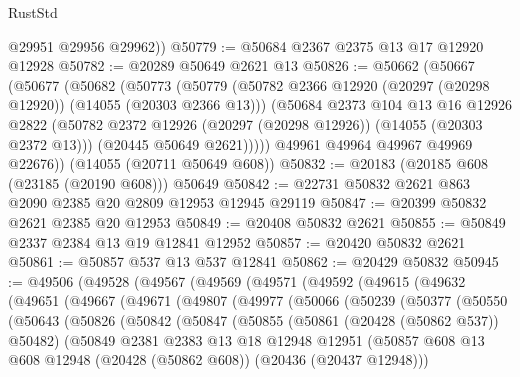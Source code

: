 \begin{lexlean}{RustStd}
\begin{coremodule}
        @29951
        @29956
        @29962))
@50779 := @50684 @2367 @2375 @13 @17 @12920 @12928
@50782 := @20289 @50649 @2621 @13
@50826 := @50662
    (@50667
      (@50677
        (@50682
          (@50773
            (@50779
              (@50782 @2366 @12920 (@20297 (@20298 @12920)) (@14055 (@20303 @2366 @13)))
              (@50684
                @2373
                @104
                @13
                @16
                @12926
                @2822
                (@50782 @2372 @12926 (@20297 (@20298 @12926)) (@14055 (@20303 @2372 @13)))
                (@20445 @50649 @2621)))))
        @49961
        @49964
        @49967
        @49969
        @22676))
    (@14055 (@20711 @50649 @608))
@50832 := @20183 (@20185 @608 (@23185 (@20190 @608))) @50649
@50842 := @22731 @50832 @2621 @863 @2090 @2385 @20 @2809 @12953 @12945 @29119
@50847 := @20399 @50832 @2621 @2385 @20 @12953
@50849 := @20408 @50832 @2621
@50855 := @50849 @2337 @2384 @13 @19 @12841 @12952
@50857 := @20420 @50832 @2621
@50861 := @50857 @537 @13 @537 @12841
@50862 := @20429 @50832
@50945 := @49506
    (@49528
      (@49567
        (@49569
          (@49571
            (@49592
              (@49615
                (@49632
                  (@49651
                    (@49667
                      (@49671
                        (@49807
                          (@49977
                            (@50066
                              (@50239
                                (@50377
                                  (@50550
                                    (@50643
                                      (@50826
                                        (@50842
                                          (@50847
                                            (@50855
                                              (@50861 (@20428 (@50862 @537)) @50482)
                                              (@50849
                                                @2381
                                                @2383
                                                @13
                                                @18
                                                @12948
                                                @12951
                                                (@50857
                                                  @608
                                                  @13
                                                  @608
                                                  @12948
                                                  (@20428 (@50862 @608))
                                                  (@20436 (@20437 @12948)))

\end{coremodule}
\end{lexlean}
